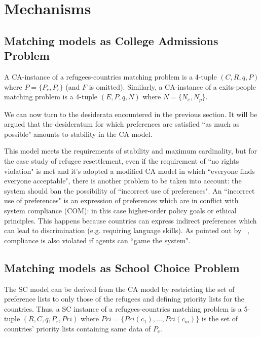 \section{Mechanisms}\label{mechanisms}%


\subsection{Matching models as College Admissions Problem}\label{matching-model-as-college-admissions-problem}%

A CA-instance of a refugees-countries matching problem is a 4-tuple \((C, R, q, P)\) where \(P = \{P_c, P_r\}\) (and \(F\) is omitted). Similarly, a CA-instance of a exits-people matching problem is a 4-tuple \((E, P, q, N)\) where \(N = \{N_e, N_p\}\).

We can now turn to the desiderata encountered in the previous section. It will be argued that the desideratum for which preferences are satisfied “as much as possible" amounts to stability in the CA model.

This model meets the requirements of stability and maximum cardinality, but for the case study of refugee resettlement, even if the requirement of “no rights violation" is met and it's adopted a modified CA model in which “everyone finds everyone acceptable", there is another problem to be taken into account: the system should ban the possibility of “incorrect use of preferences". An “incorrect use of preferences" is an expression of preferences which are in conflict with system compliance (COM): in this case higher-order policy goals or ethical principles. This happens because countries can express indirect preferences which can lead to discrimination (e.g. requiring language skills). As pointed out by ~\cite{basshuysen}, compliance is also violated if agents can “game the system".


\subsection{Matching models as School Choice Problem}\label{matching-model-as-school-choice-problem}%

The SC model can be derived from the CA model by restricting the set of preference lists to only those of the refugees and defining priority lists for the countries. Thus, a SC instance of a refugees-countries matching problem is a 5-tuple \((R, C, q, P_r, Pri)\) where \(Pri = \{Pri(c_1), \dots, Pri(c_m)\}\) is the set of countries’ priority lists containing same data of \(P_c\).

